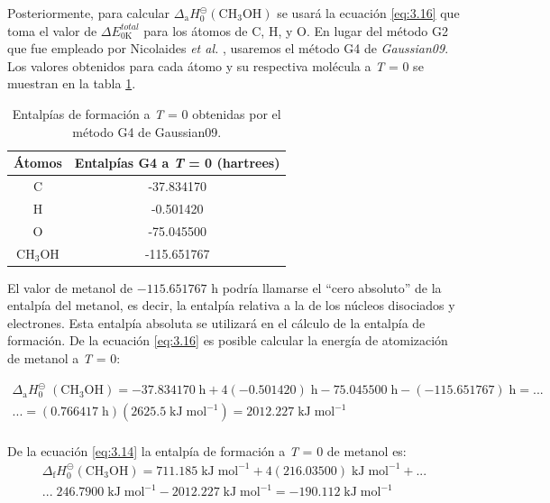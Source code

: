 Posteriormente, para calcular $\Delta_{\mathrm{a}} H^{\circleddash}_{0} \mathrm{(CH_3OH)}$ se usará la ecuación \ref{eq:3.16} que toma el valor de $\Delta E^{total}_{0\mathrm{K}}$ para los átomos de  C, H, y O. En lugar del método G2 que fue empleado por Nicolaides \textit{et al.} \cite{Nicolaides1996}, usaremos el método G4 de \textit{Gaussian09}. Los valores obtenidos para cada átomo y su respectiva molécula a \textit{T} = 0 se muestran en la tabla \ref{G4-table}.\\


\begin{table}[H]
\begin{center}
\begin{tabular}{||c|c||}
\hline 
	Átomos  & Entalpías G4 a \textit{T} = 0  (hartrees) \\ 
\hline
\hline 
C & -37.834170 \\ 
\hline 
H & -0.501420 \\ 
\hline 
O & -75.045500 \\ 
\hline 
CH$_{3}$OH & -115.651767 \\
\hline
\end{tabular}
	\caption{Entalpías de formación a \textit{T} = 0 obtenidas por el método G4 de Gaussian09.}
\label{G4-table}
\end{center}
\end{table}


El valor de metanol de $-115.651767$ h podría llamarse el ``cero absoluto'' de la entalpía del metanol, es decir, la entalpía relativa a la de los núcleos disociados y electrones. Esta entalpía absoluta se utilizará en el cálculo de la entalpía de formación. De la ecuación \ref{eq:3.16} es posible calcular la energía de atomización de metanol a \textit{T} = 0:

\begin{multline}
	\Delta_{\mathrm{a}} H^{\circleddash}_{0}\;\mathrm{(CH_3OH)} = -37.834170\;\mathrm{h} + 4(-0.501420)\;\mathrm{h}-75.045500\;\mathrm{h}-(-115.651767)\;\mathrm{h} =...\\
	...= (0.766417\;\mathrm{h})(2625.5\;\mathrm{kJ\;mol^{-1}}) = 2012.227\;\mathrm{kJ\;mol^{-1}}
\label{eq:3.17}
\end{multline}\\

De la ecuación \ref{eq:3.14} la entalpía de formación a \textit{T} = 0 de metanol es:\\

\begin{multline}
	\Delta_{\mathrm{f}} H^{\circleddash}_{0}\mathrm{(CH_3OH)} = 711.185\;\mathrm{kJ\;mol^{-1}} + 4(216.03500)\;\mathrm{kJ\;mol^{-1}} +... \\...\; 246.7900\;\mathrm{kJ\;mol^{-1}}- 2012.227\;\mathrm{kJ\;mol^{-1} = -190.112\;kJ\;mol^{-1}}
\label{eq:3.18}
\end{multline}\\

